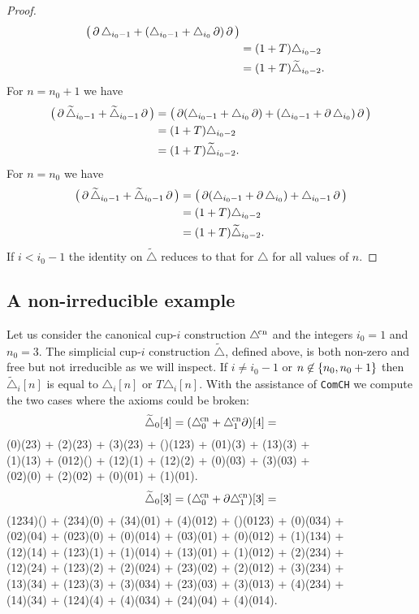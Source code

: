 \begin{proof}
\begin{align*}
		\big(\operatorname{\partial}\triangle_{i_0-1} + (\triangle_{i_0-1} + \triangle_{i_0} \operatorname{\partial})\operatorname{\partial}\big) \\ &=
		(1+T)\triangle_{i_0-2} \\ &=
		(1+T)\widetilde\triangle_{i_0-2}.
	\end{align*}
	For $n = n_0+1$ we have
	\begin{align*}
		\big(\operatorname{\partial}\widetilde\triangle_{i_0-1} + \widetilde\triangle_{i_0-1} \operatorname{\partial}\big) &=
		\big(\operatorname{\partial}(\triangle_{i_0-1} + \triangle_{i_0} \operatorname{\partial}) + (\triangle_{i_0-1} + \operatorname{\partial}\triangle_{i_0})\operatorname{\partial} \big) \\ &=
		(1+T)\triangle_{i_0-2} \\ &=
		(1+T)\widetilde\triangle_{i_0-2}.
	\end{align*}
	For $n = n_0$ we have
	\begin{align*}
		\big(\operatorname{\partial}\widetilde\triangle_{i_0-1} + \widetilde\triangle_{i_0-1} \operatorname{\partial}\big) &=
		\big(\operatorname{\partial}(\triangle_{i_0-1} + \operatorname{\partial}\triangle_{i_0}) + \triangle_{i_0-1}\operatorname{\partial} \big) \\ &=
		(1+T)\triangle_{i_0-2} \\ &=
		(1+T)\widetilde\triangle_{i_0-2}.
	\end{align*}
	If $i<i_0-1$ the identity on $\widetilde\triangle$ reduces to that for $\triangle$ for all values of $n$.
\end{proof}

\subsection{A non-irreducible example}

Let us consider the canonical \mbox{cup-$i$} construction $\triangle^{\!\mathrm{cn}}$ and the integers $i_0=1$ and $n_0=3$.
The simplicial \mbox{cup-$i$} construction $\widetilde\triangle$, defined above, is both non-zero and free but not irreducible as we will inspect.
If $i \neq i_0-1$ or $n \not\in \{n_0,n_0+1\}$ then $\widetilde\triangle_i[n]$ is equal to $\triangle_i[n]$ or $T\triangle_i[n]$.
With the assistance of \texttt{ComCH} we compute the two cases where the axioms could be broken:
\[
\widetilde\triangle_0[4] = (\triangle^{\!\mathrm{cn}}_0 + \triangle^{\!\mathrm{cn}}_1\partial)[4] =
\]
\noindent
{\ttfamily
	(0)(23) + (2)(23) + (3)(23) + ()(123) + (01)(3) + (13)(3) +\\
	(1)(13) + (012)() + (12)(1) + (12)(2) + (0)(03) + (3)(03) +\\
	(02)(0) + (2)(02) + (0)(01) + (1)(01).}
\[
\widetilde\triangle_0[3] = (\triangle^{\!\mathrm{cn}}_0 + \partial\triangle^{\!\mathrm{cn}}_1)[3] =
\]
\noindent
{\ttfamily
	(1234)() + (234)(0) + (34)(01) + (4)(012) + ()(0123) + (0)(034) +\\
	(02)(04) + (023)(0) + (0)(014) + (03)(01) + (0)(012) + (1)(134) +\\
	(12)(14) + (123)(1) + (1)(014) + (13)(01) + (1)(012) + (2)(234) +\\
	(12)(24) + (123)(2) + (2)(024) + (23)(02) + (2)(012) + (3)(234) +\\
	(13)(34) + (123)(3) + (3)(034) + (23)(03) + (3)(013) + (4)(234) +\\
	(14)(34) + (124)(4) + (4)(034) + (24)(04) + (4)(014).}

